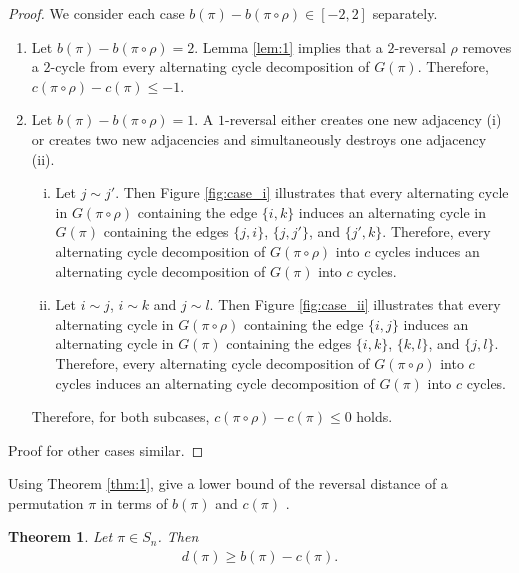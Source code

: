 \documentclass[11pt,DIV=11]{scrartcl}
\newtheorem{theorem}{Theorem}[section]
\theoremstyle{definition}
\theoremstyle{remark}
\begin{document}
\begin{proof}
We consider each case $b(\pi) - b(\pi \circ \rho) \in [-2,2]$ separately.
\begin{enumerate}
    \item Let $b(\pi) - b(\pi \circ \rho) = 2$. Lemma \ref{lem:1} implies that a $2$-reversal $\rho$ removes a $2$-cycle from every alternating cycle decomposition of $G(\pi)$. Therefore, $c(\pi \circ \rho) - c(\pi) \leq -1$.
    \item Let $b(\pi) - b(\pi \circ \rho) = 1$. A $1$-reversal either creates one new adjacency (i) or creates two new adjacencies and simultaneously destroys one adjacency (ii).
        \begin{enumerate}[(i)]
            \item Let $j \sim j'$. Then Figure \ref{fig:case_i} illustrates that every alternating cycle in $G(\pi \circ \rho)$ containing the edge $\{i,k\}$ induces an alternating cycle in $G(\pi)$ containing the edges $\{j,i\}$, $\{j,j'\}$, and $\{j',k\}$. Therefore, every alternating cycle decomposition of $G(\pi \circ \rho)$ into $c$ cycles induces an alternating cycle decomposition of $G(\pi)$ into $c$ cycles.
            \item Let $i \sim j$, $i \sim k$ and $j \sim l$. Then Figure \ref{fig:case_ii} illustrates that every alternating cycle in $G(\pi \circ \rho)$ containing the edge $\{i,j\}$ induces an alternating cycle in $G(\pi)$ containing the edges $\{i,k\}$, $\{k,l\}$, and $\{j,l\}$. Therefore, every alternating cycle decomposition of $G(\pi \circ \rho)$ into $c$ cycles induces an alternating cycle decomposition of $G(\pi)$ into $c$ cycles.
        \end{enumerate}
    Therefore, for both subcases, $c(\pi \circ \rho) - c(\pi) \leq 0$ holds.
\end{enumerate}
Proof for other cases similar.
\end{proof}

Using Theorem \ref{thm:1}, \citeauthor*{Bafna1996} give a lower bound of the reversal distance of a permutation $\pi$ in terms of $b(\pi)$ and $c(\pi)$ \cite{Bafna1996}.

\begin{theorem}
\label{thm:2}
Let $\pi \in S_n$. Then
\begin{align*}
    d(\pi) \geq b(\pi) - c(\pi).
\end{align*}
\end{theorem}
\end{document}
